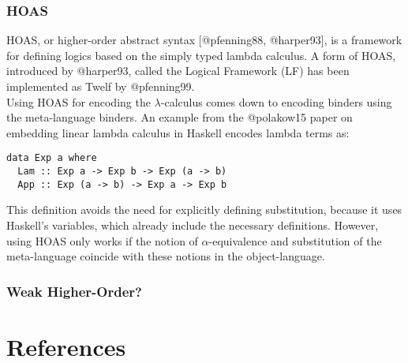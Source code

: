 \subsubsection{HOAS}\label{hoas}

HOAS, or higher-order abstract syntax {[}@pfenning88, @harper93{]}, is a
framework for defining logics based on the simply typed lambda calculus.
A form of HOAS, introduced by @harper93, called the Logical Framework
(LF) has been implemented as Twelf by @pfenning99.\\
Using HOAS for encoding the \(\lambda\)-calculus comes down to encoding
binders using the meta-language binders. An example from the @polakow15
paper on embedding linear lambda calculus in Haskell encodes lambda
terms as:

\begin{verbatim}
data Exp a where
  Lam :: Exp a -> Exp b -> Exp (a -> b)
  App :: Exp (a -> b) -> Exp a -> Exp b
\end{verbatim}

This definition avoids the need for explicitly defining substitution,
because it uses Haskell's variables, which already include the necessary
definitions. However, using HOAS only works if the notion of
\(\alpha\)-equivalence and substitution of the meta-language coincide
with these notions in the object-language.

\subsubsection{Weak Higher-Order?}\label{weak-higher-order}

\section{References}\label{references}
